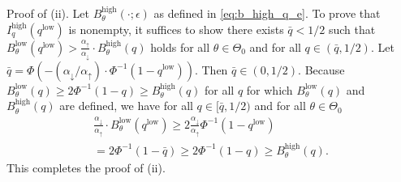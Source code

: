 \documentclass[journal]{IEEEtran}
\renewcommand{\geq}{\geqslant} %
\renewcommand{\leq}{\leqslant} %
\theoremstyle{definition}
\newcommand{\aup}{\alpha_{\uparrow}}
\newcommand{\adown}{\alpha_{\downarrow}}
\begin{document}
Proof of (ii).  
Let $B_\theta^\mathrm{high}(\cdot;\epsilon)$ as defined in \eqref{eq:b_high_q_e}.
To prove that $I_q^\mathrm{high}(q^\mathrm{low})$ is nonempty, it suffices to show there exists $\bar{q} < 1/2$ such that 
$B_\theta^\mathrm{low}(q^\mathrm{low}) > \frac{\aup}{\adown}\cdot B_\theta^\mathrm{high}(q)$ holds for all $\theta \in \Theta_0$ and for all $q \in (\bar{q}, 1/2)$.
Let $\bar{q} = \Phi\left( - \left(\adown / \aup\right)\cdot \Phi^{-1}\left(1 - q^\mathrm{low} \right) \right)$.
Then $\bar{q} \in (0, 1/2)$. 
Because $B_\theta^\mathrm{low}(q) \geq 2\Phi^{-1}(1-q) \geq B_\theta^\mathrm{high}(q)$ for all $q$ for which $B_\theta^\mathrm{low}(q)$ and $B_\theta^\mathrm{high}(q)$ are defined, we have for all $q \in [\bar{q}, 1/2)$ and for all $\theta \in \Theta_0$
\begin{multline}
\frac{\adown}{\aup} \cdot B_\theta^\mathrm{low}(q^\mathrm{low}) 
\geq 2 \frac{\adown}{\aup} \Phi^{-1}(1-q^\mathrm{low}) 
\\
= 2\Phi^{-1}(1-\bar{q}) 
\geq 2\Phi^{-1}(1-q) 
\geq B_\theta^\mathrm{high}(q) .
\end{multline}
This completes the proof of (ii).

\end{document}
